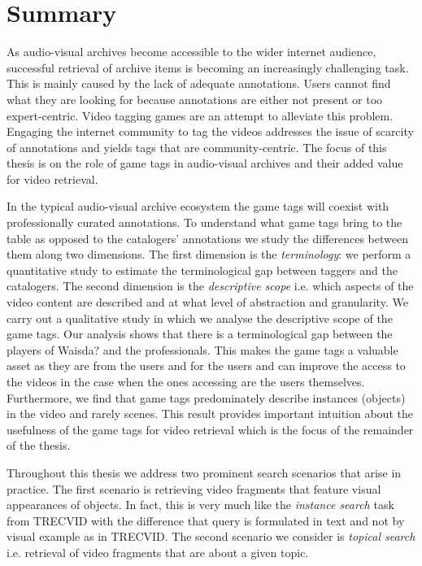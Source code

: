 \chapter*{Summary}
\pagestyle{summary}

As audio-visual archives become accessible to the wider internet audience, successful retrieval of archive items is becoming an increasingly challenging task. This is mainly caused by the lack of
adequate annotations. Users cannot find what they are looking for because annotations are either not present or too expert-centric. Video tagging games are an attempt to alleviate this problem.
Engaging the internet community to tag the videos addresses the issue of scarcity of annotations and yields tags that are community-centric. The focus of this thesis is on the role of game tags in audio-visual archives and their added value for video retrieval.

In the typical audio-visual archive ecosystem the game tags will coexist with professionally curated annotations. To understand what game tags bring to the table as opposed to the catalogers'
annotations we study the differences between them along two dimensions. The first dimension is the \textit{terminology}: we perform a quantitative study to estimate the terminological gap between taggers
and the catalogers. The second dimension is the \textit{descriptive scope} i.e. which aspects of the video content are described and at what level of abstraction and granularity. We carry out a qualitative
study in which we analyse the descriptive scope of the game tags. Our analysis shows that there is a terminological gap between the players of Waisda? and the professionals. This makes the game tags
a valuable asset as they are from the users and for the users and can improve the access to the videos in the case when the ones accessing are the users themselves. Furthermore, we find that
game tags predominately describe instances (objects) in the video and rarely scenes. This result provides important intuition about the usefulness of the game tags for video retrieval which is the
focus of the remainder of the thesis.

Throughout this thesis we address two prominent search scenarios that arise in practice. The first scenario is retrieving video fragments that feature visual appearances of objects. In fact, this is very
much like the \textit{instance search} task from TRECVID with the difference that query is formulated in text and not by visual example as in TRECVID. The second scenario we consider is \textit{topical search} i.e. retrieval of video fragments that are about a given topic.

